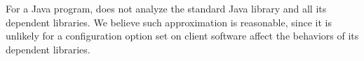 


For a Java program, \ourtool does not analyze the standard Java
library and all its dependent libraries. We believe such approximation
is reasonable, since it is
unlikely for a configuration option set on client software
affect the behaviors of its dependent libraries.

